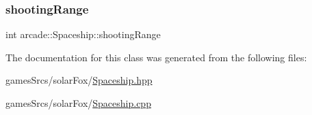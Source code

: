 \mbox{\label{classarcade_1_1_spaceship_a414281f267135317527aeb86e170d892}} 
\subsubsection{\texorpdfstring{shooting\+Range}{shootingRange}}
{\footnotesize\ttfamily int arcade\+::\+Spaceship\+::shooting\+Range\hspace{0.3cm}{\ttfamily [protected]}}



The documentation for this class was generated from the following files\+:\begin{DoxyCompactItemize}
\item 
games\+Srcs/solar\+Fox/\hyperlink{_spaceship_8hpp}{Spaceship.\+hpp}\item 
games\+Srcs/solar\+Fox/\hyperlink{_spaceship_8cpp}{Spaceship.\+cpp}\end{DoxyCompactItemize}
